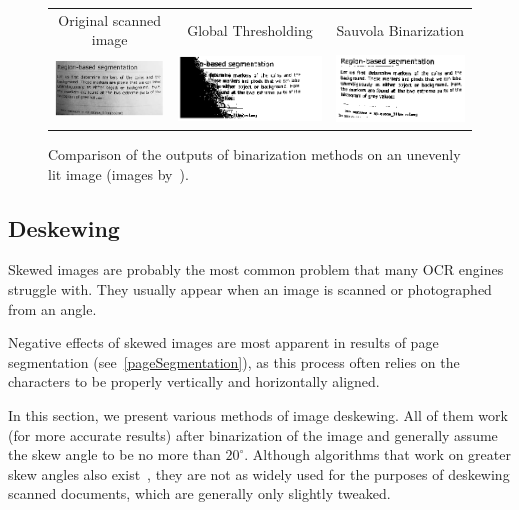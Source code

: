 \begin{figure}
\centering
{\sffamily
\begin{tabular}{ccc}
Original scanned image &
Global Thresholding &
Sauvola Binarization \\
\includegraphics[width=.3\linewidth]{img/preprocessing/bin_orig.png} &
\includegraphics[width=.3\linewidth]{img/preprocessing/bin_glob.png} &
\includegraphics[width=.3\linewidth]{img/preprocessing/bin_sauvola.png}
\end{tabular}
}
\caption{Comparison of the outputs of binarization methods on an unevenly lit image (images by~\citet{binarizationComp}).}
\label{fig:preprocessBinarization}
\end{figure}

\subsection{Deskewing} \label{deskewing}

Skewed images are probably the most common problem that many OCR engines struggle with. They usually appear when an image is scanned or photographed from an angle.

Negative effects of skewed images are most apparent in results of page segmentation (see~\cref{pageSegmentation}), as this process often relies on the characters to be properly vertically and horizontally aligned.

In this section, we present various methods of image deskewing. All of them work (for more accurate results) after binarization of the image and generally assume the skew angle to be no more than $20^{\circ}$. Although algorithms that work on greater skew angles also exist~\citep{skewAngleDetection}, they are not as widely used for the purposes of deskewing scanned documents, which are generally only slightly tweaked.

